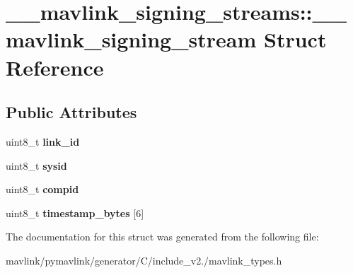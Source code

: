 \hypertarget{struct____mavlink__signing__streams_1_1____mavlink__signing__stream}{}\section{\+\_\+\+\_\+mavlink\+\_\+signing\+\_\+streams\+:\+:\+\_\+\+\_\+mavlink\+\_\+signing\+\_\+stream Struct Reference}
\label{struct____mavlink__signing__streams_1_1____mavlink__signing__stream}
\subsection*{Public Attributes}
\begin{DoxyCompactItemize}
\item 
\mbox{\label{struct____mavlink__signing__streams_1_1____mavlink__signing__stream_a460c2c122f9a4350bcbdeaea3e5aa534}} 
uint8\+\_\+t {\bfseries link\+\_\+id}
\item 
\mbox{\label{struct____mavlink__signing__streams_1_1____mavlink__signing__stream_ab8826081c0e1c8635ab2b706e046b4f6}} 
uint8\+\_\+t {\bfseries sysid}
\item 
\mbox{\label{struct____mavlink__signing__streams_1_1____mavlink__signing__stream_abdeaafd43daa73f208160ac46d510389}} 
uint8\+\_\+t {\bfseries compid}
\item 
\mbox{\label{struct____mavlink__signing__streams_1_1____mavlink__signing__stream_ac2dacf1fa619460cfe828939921ec091}} 
uint8\+\_\+t {\bfseries timestamp\+\_\+bytes} \mbox{[}6\mbox{]}
\end{DoxyCompactItemize}


The documentation for this struct was generated from the following file\+:\begin{DoxyCompactItemize}
\item 
mavlink/pymavlink/generator/\+C/include\+\_\+v2./mavlink\+\_\+types.\+h\end{DoxyCompactItemize}
